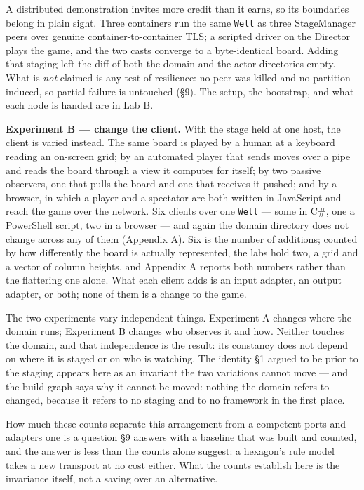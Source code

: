\documentclass[
]{article}
\newcounter{none} %
\begin{document}
A distributed demonstration invites more credit than it earns, so its
boundaries belong in plain sight. Three containers run the same
\texttt{Well} as three StageManager peers over genuine
container-to-container TLS; a scripted driver on the Director plays the
game, and the two casts converge to a byte-identical board. Adding that
staging left the diff of both the domain and the actor directories
empty. What is \emph{not} claimed is any test of resilience: no peer was
killed and no partition induced, so partial failure is untouched (§9).
The setup, the bootstrap, and what each node is handed are in Lab B.

\textbf{Experiment B --- change the client.} With the stage held at one
host, the client is varied instead. The same board is played by a human
at a keyboard reading an on-screen grid; by an automated player that
sends moves over a pipe and reads the board through a view it computes
for itself; by two passive observers, one that pulls the board and one
that receives it pushed; and by a browser, in which a player and a
spectator are both written in JavaScript and reach the game over the
network. Six clients over one \texttt{Well} --- some in C\#, one a
PowerShell script, two in a browser --- and again the domain directory
does not change across any of them (Appendix A). Six is the number of
additions; counted by how differently the board is actually represented,
the labs hold two, a grid and a vector of column heights, and Appendix A
reports both numbers rather than the flattering one alone. What each
client adds is an input adapter, an output adapter, or both; none of
them is a change to the game.

The two experiments vary independent things. Experiment A changes where
the domain runs; Experiment B changes who observes it and how. Neither
touches the domain, and that independence is the result: its constancy
does not depend on where it is staged or on who is watching. The
identity §1 argued to be prior to the staging appears here as an
invariant the two variations cannot move --- and the build graph says
why it cannot be moved: nothing the domain refers to changed, because it
refers to no staging and to no framework in the first place.

How much these counts separate this arrangement from a competent
ports-and-adapters one is a question §9 answers with a baseline that was
built and counted, and the answer is less than the counts alone suggest:
a hexagon's rule model takes a new transport at no cost either. What the
counts establish here is the invariance itself, not a saving over an
alternative.
\end{document}
